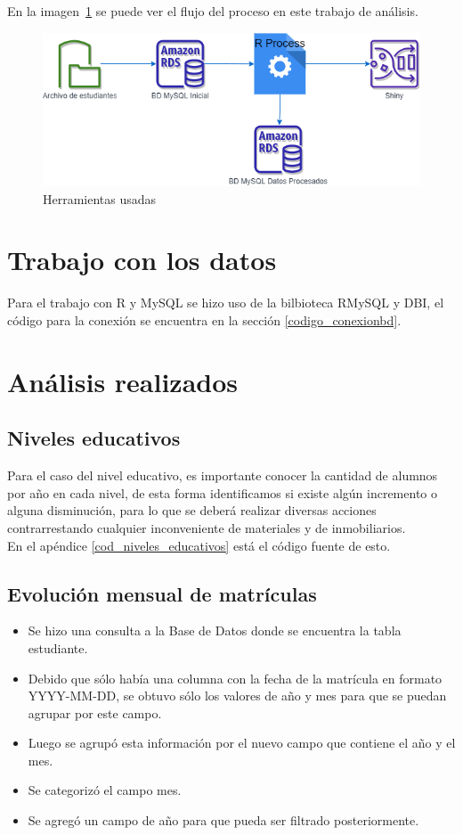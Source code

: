 En la imagen~\ref{fig:proceso} se puede ver el flujo del proceso en este trabajo de análisis.
\begin{figure}[th]
\centering
\includegraphics[width=1.1\textwidth]{Figures/proceso-archi}
\decoRule
\caption[Proceso de exploración de los datos]{Herramientas usadas}
\label{fig:proceso}
\end{figure}

\section{Trabajo con los datos}

Para el trabajo con R y MySQL se hizo uso de la bilbioteca RMySQL y DBI, el código para la conexión se encuentra en la sección \ref{codigo_conexionbd}.

\section{Análisis realizados}

\subsection{Niveles educativos}
Para el caso del nivel educativo, es importante conocer la cantidad de alumnos por año en cada nivel, de esta forma identificamos si existe algún incremento o alguna disminución, para lo que se deberá realizar diversas acciones contrarrestando cualquier inconveniente de materiales y de inmobiliarios. \\
En el apéndice \ref{cod_niveles_educativos} está el código fuente de esto.

\subsection{Evolución mensual de matrículas}
\begin{itemize}
\item Se hizo una consulta a la Base de Datos donde se encuentra la tabla estudiante.
\item Debido que sólo había una columna con la fecha de la matrícula en formato YYYY-MM-DD, se obtuvo sólo los valores de año y mes para que se puedan agrupar por este campo.
\item Luego se agrupó esta información por el nuevo campo que contiene el año y el mes.
\item Se categorizó el campo mes.
\item Se agregó un campo de año para que pueda ser filtrado posteriormente.
\end{itemize}

